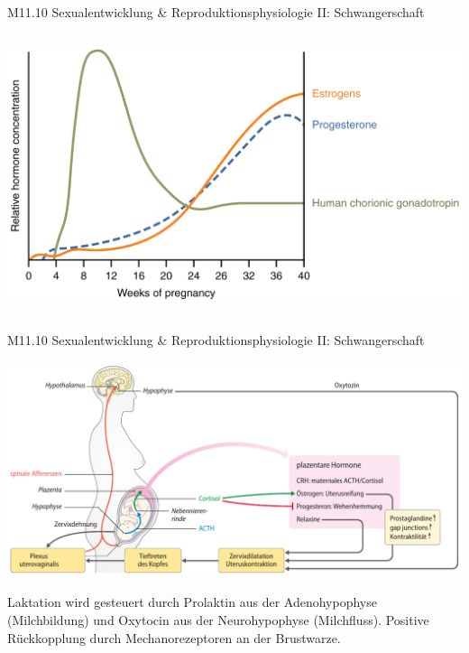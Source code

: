 \documentclass{beamer}
\begin{document}
\begin{frame}{M11.10 Sexualentwicklung \& Reproduktionsphysiologie II: Schwangerschaft}
\begin{columns}[c]
\begin{column}{5cm}


\begin{center}
\includegraphics[width=\textwidth]{pregnancy_hormones.png}    
\end{center}



\end{column}

\end{columns}


\end{frame} 

\begin{frame}{M11.10 Sexualentwicklung \& Reproduktionsphysiologie II: Schwangerschaft}
    
    \begin{center}
        \includegraphics[width=\textwidth]{geburt_hormone.png}
    \end{center}
    
    \pause
    
    Laktation wird gesteuert durch Prolaktin aus der Adenohypophyse (Milchbildung) und Oxytocin aus der Neurohypophyse (Milchfluss). Positive Rückkopplung durch Mechanorezeptoren an der Brustwarze. 
    
    
\end{frame}
\end{document}
